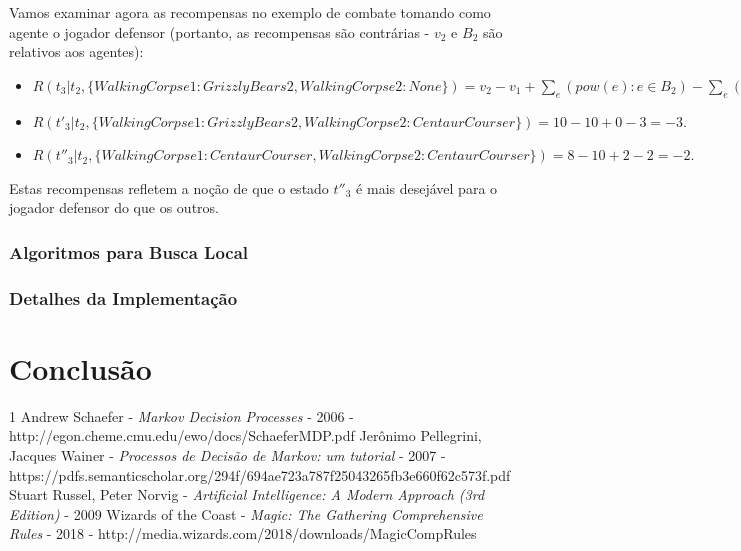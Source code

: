 \documentclass[dvipsnames]{book}
\begin{document}
\begin{itemize}
Vamos examinar agora as recompensas no exemplo de combate tomando como agente o jogador defensor (portanto, as recompensas são contrárias - $v_2$ e $B_2$ são relativos aos agentes):

\begin{itemize}
  \item $R(t_3 | t_2, \{WalkingCorpse1 : GrizzlyBears2, WalkingCorpse2 : None\}) = v_2 - v_1 + \sum\limits_e(pow(e) : e \in B_2) - \sum\limits_e(pow(e) : e \in B_1) = 7 - 10 + 2 - 5 = -6.$
  \item $R(t'_3| t_2, \{WalkingCorpse1 : GrizzlyBears2, WalkingCorpse2 : CentaurCourser\}) = 10 - 10 + 0 - 3 = -3.$
  \item $R(t''_3| t_2, \{WalkingCorpse1 : CentaurCourser, WalkingCorpse2 : CentaurCourser\}) = 8 - 10 + 2 - 2 = -2.$
\end{itemize}
Estas recompensas refletem a noção de que o estado $t''_3$ é mais desejável para o jogador defensor do que os outros.

\end{itemize}

\subsection{Algoritmos para Busca Local}

\subsection{Detalhes da Implementação}

\chapter{Conclusão}


\begin{thebibliography}{1}
  Andrew Schaefer - {\em Markov Decision Processes} - 2006 - http://egon.cheme.cmu.edu/ewo/docs/SchaeferMDP.pdf
  Jerônimo Pellegrini, Jacques Wainer - {\em Processos de Decisão de Markov: um tutorial} - 2007 - https://pdfs.semanticscholar.org/294f/694ae723a787f25043265fb3e660f62c573f.pdf
  Stuart Russel, Peter Norvig - {\em Artificial Intelligence: A Modern Approach (3rd Edition)} - 2009
  Wizards of the Coast - {\em Magic: The Gathering Comprehensive Rules} - 2018 - http://media.wizards.com/2018/downloads/MagicCompRules%
\end{thebibliography}
\end{document}
